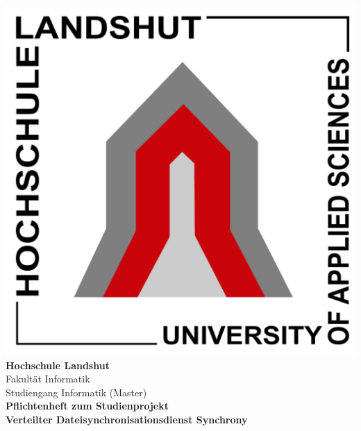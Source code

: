 \documentclass[12pt,oneside,a4paper,bibtotoc,liststotoc,pointlessnumbers]{scrartcl}
\begin{document}
\begin{center}
\includegraphics[scale=0.16]{hs.pdf}\\
\vspace*{10pt}
\textsf{\textbf{\large{Hochschule Landshut}}}\\
\textsf{\normalsize{Fakultät Informatik \\ Studiengang Informatik (Master)}}\\
\vspace*{70pt}
\textsf{\textbf{\Huge{Pflichtenheft zum Studienprojekt}}} \\
\vspace*{20pt}
\textsf{\textbf{\large{Verteilter Dateisynchronisationsdienst \vspace*{20pt} Synchrony}}}\\
\end{center}
\vspace*{180pt}
\end{document}
